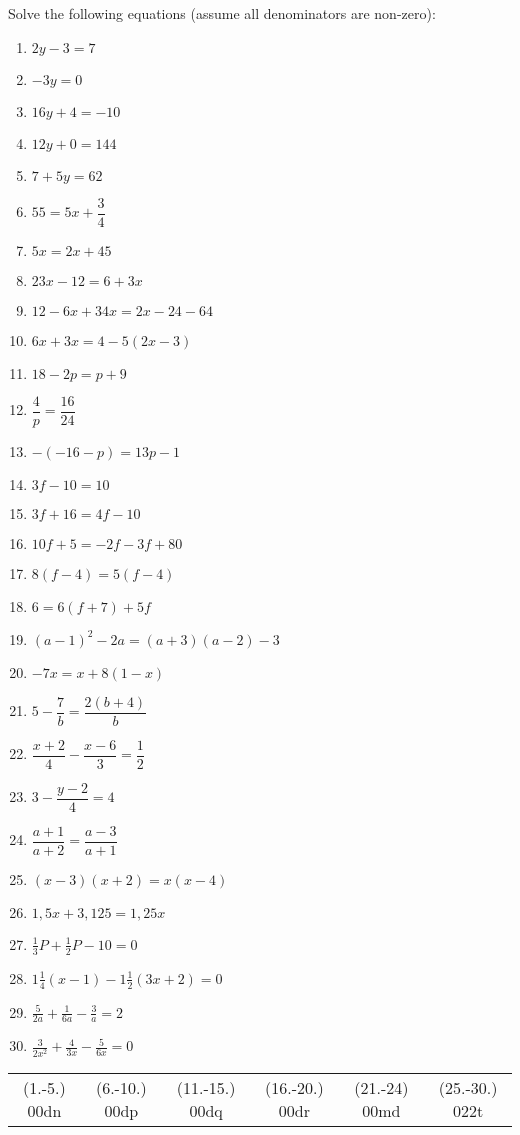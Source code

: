 \begin{exercises}{}
{Solve the following equations (assume all denominators are non-zero):

\begin{multicols}{2}
\begin{enumerate}[itemsep=6pt, label=\textbf{\arabic*}. ] 
\item   $2y-3=7$
\item   $-3y=0$        
\item   $16y+4=-10$        
\item   $12y+0=144$
\item   $7+5y=62$       
\item   $55=5x+\dfrac{3}{4}$ 
\item   $5x=2x+45$        
\item   $23x-12=6+3x$
\item   $12-6x+34x=2x-24-64$
\item   $6x+3x=4-5(2x-3)$
\item   $18-2p=p+9$   
\item   $\dfrac{4}{p}=\dfrac{16}{24}$
\item   $-(-16-p)=13p-1$
\item   $3f-10=10$
\item   $3f+16=4f-10$
\item   $10f+5=-2f-3f+80$
\item   $8(f-4)=5(f-4)$
\item  $6=6(f+7)+5f$      
\item $(a-1)^{2} - 2a = (a+3)(a-2) - 3$
\item $-7x = x+8(1-x)$ 
\item $5-\dfrac{7}{b} = \dfrac{2(b+4)}{b}$
\item $\dfrac{x+2}{4} - \dfrac{x-6}{3} = \dfrac{1}{2}$
\item $ 3 - \dfrac{y-2}{4} = 4$
\item $ \dfrac{a+1}{a+2} = \dfrac{a-3}{a+1}$
\item $(x-3)(x+2)=x(x-4)$
\item $1,5x+3,125=1,25x$
\item $\frac{1}{3}P + \frac{1}{2}P - 10 = 0$
\item $1 \frac{1}{4} (x-1)-1\frac{1}{2}(3x+2)=0$
\item $\frac{5}{2a}+\frac{1}{6a}-\frac{3}{a}=2$
\item $\frac{3}{2x^2}+\frac{4}{3x}-\frac{5}{6x}=0$  
\end{enumerate}
\end{multicols}
\practiceinfo
\par 
\par \begin{tabular}[h]{cccccc}
(1.-5.) 00dn&  (6.-10.) 00dp&  (11.-15.) 00dq&  (16.-20.) 00dr& (21.-24) 00md & (25.-30.) 022t & \end{tabular}
}
\end{exercises}

